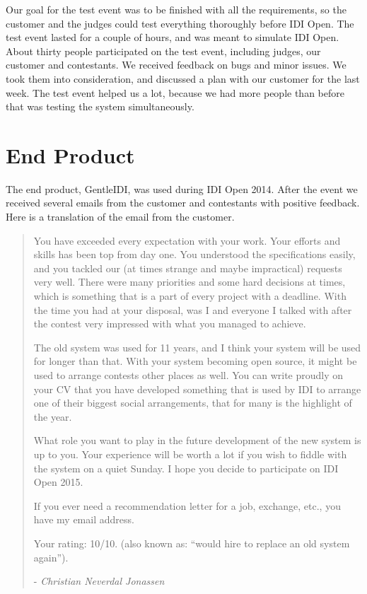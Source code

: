 Our goal for the test event was to be finished with all the
requirements, so the customer and the judges could test everything
thoroughly before IDI Open. The test event lasted for a couple of
hours, and was meant to simulate IDI Open. About thirty people
participated on the test event, including judges, our customer and
contestants. We received feedback on bugs and minor issues. We took
them into consideration, and discussed a plan with our customer for the
last week. The test event helped us a lot, because we had more people
than before that was testing the system simultaneously. 

\section{End Product}

The end product, GentleIDI, was used during IDI Open 2014. After the
event we received several emails from the customer and contestants with
positive feedback. Here is a translation of the email from
the customer.

\begin{quotation}
You have exceeded every expectation with your work.
Your efforts and skills has been top from day one. You understood the
specifications easily, and you tackled our (at times strange and maybe
impractical) requests very well. There were many priorities and some
hard decisions at times, which is something that is a part of every
project with a deadline. With the time you had at your disposal, was I
and everyone I talked with after the contest very impressed with what
you managed to achieve.

The old system was used for 11 years, and I think your system will be
used for longer than that. With your system becoming open source, it
might be used to arrange contests other places as well. You can write
proudly on your CV that you have developed something that is used by
IDI to arrange one of their biggest social arrangements, that for many
is the highlight of the year.

What role you want to play in the future development of the new system
is up to you. Your experience will be worth a lot if you wish to fiddle
with the system on a quiet Sunday. I hope you decide to participate on
IDI Open 2015.

If you ever need a recommendation letter for a job, exchange, etc., you
have my email address.

Your rating: 10/10. (also known as: ``would hire to
replace an old system again'').

\hfill- \textit{Christian Neverdal Jonassen}
\end{quotation}


